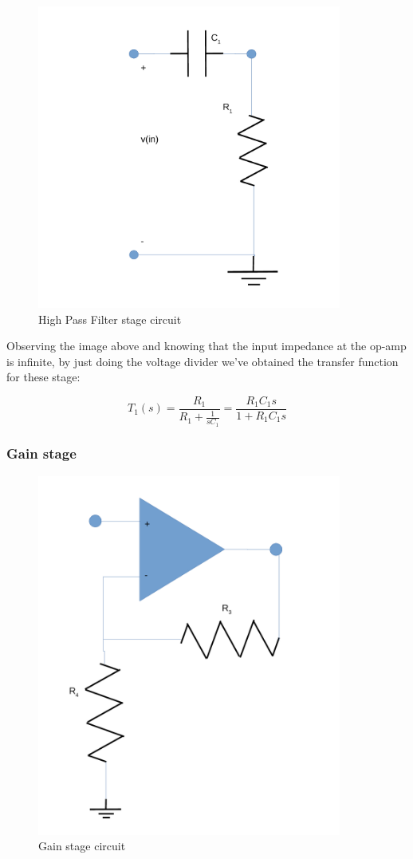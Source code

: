 \begin{figure}[H] 
\centering
\includegraphics[width= 10cm]{high_pass_l5.pdf} 
\caption{High Pass Filter stage circuit}
\label{hf}
\end{figure}

Observing the image above and knowing that the input impedance at the op-amp is infinite, by just doing the voltage divider we've obtained the transfer function for these stage:

\begin{equation}
T_1(s) = \frac{R_1}{R_1 + \frac{1}{sC_1}} = \frac{R_1C_1s}{1+R_1C_1s}
\end{equation}   

\subsubsection{Gain stage}

\begin{figure}[H] 
\centering
\includegraphics[width= 10cm]{amp_l5.pdf} 
\caption{Gain stage circuit}
\label{gainstage}
\end{figure}

